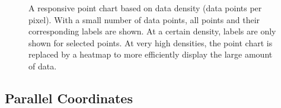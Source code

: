 \begin{figure}[tp]
\centering
{}
\hfill
{}
\hfill
{}
\caption[Responsive Point Chart Example]
{
A responsive point chart based on data density (data
points per pixel).  With a small
number of data points, all points and their corresponding labels are
shown.  At a certain density, labels
are only shown for selected points. 
At very high densities, the point chart is replaced by a heatmap to
more efficiently display the large amount of data.
}
\label{fig:RespScatterExample}
\end{figure}


\subsection{Parallel Coordinates}

